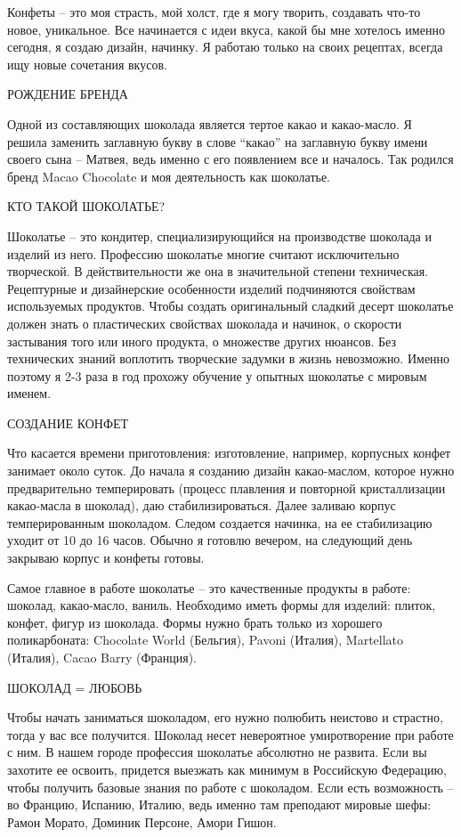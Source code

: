 
Конфеты – это моя страсть, мой холст, где я могу творить, создавать что-то
новое, уникальное. Все начинается с идеи вкуса, какой бы мне хотелось именно
сегодня, я создаю дизайн, начинку. Я работаю только на своих рецептах, всегда
ищу новые сочетания вкусов.


РОЖДЕНИЕ БРЕНДА

Одной из составляющих шоколада является тертое какао и какао-масло. Я решила
заменить заглавную букву в слове \enquote{какао} на заглавную букву имени своего сына –
Матвея, ведь именно с его появлением все и началось. Так родился бренд Macao
Chocolate и моя деятельность как шоколатье.


КТО ТАКОЙ ШОКОЛАТЬЕ?

Шоколатье – это кондитер, специализирующийся на производстве шоколада и изделий
из него. Профессию шоколатье многие считают исключительно творческой. В
действительности же она в значительной степени техническая. Рецептурные и
дизайнерские особенности изделий подчиняются свойствам используемых продуктов.
Чтобы создать оригинальный сладкий десерт шоколатье должен знать о пластических
свойствах шоколада и начинок, о скорости застывания того или иного продукта, о
множестве других нюансов. Без технических знаний воплотить творческие задумки в
жизнь невозможно. Именно поэтому я 2-3 раза в год прохожу обучение у опытных
шоколатье с мировым именем.

СОЗДАНИЕ КОНФЕТ

Что касается времени приготовления: изготовление, например, корпусных конфет
занимает около суток. До начала я созданию дизайн какао-маслом, которое нужно
предварительно темперировать (процесс плавления и повторной кристаллизации
какао-масла в шоколад), даю стабилизироваться. Далее заливаю корпус
темперированным шоколадом. Следом создается начинка, на ее стабилизацию уходит
от 10 до 16 часов. Обычно я готовлю вечером, на следующий день закрываю корпус
и конфеты готовы.

Самое главное в работе шоколатье – это качественные продукты в работе: шоколад,
какао-масло, ваниль. Необходимо иметь формы для изделий: плиток, конфет, фигур
из шоколада. Формы нужно брать только из хорошего поликарбоната: Chocolate
World (Бельгия), Pavoni (Италия), Martellato (Италия), Cacao Barry (Франция).

ШОКОЛАД = ЛЮБОВЬ

Чтобы начать заниматься шоколадом, его нужно полюбить неистово и страстно,
тогда у вас все получится. Шоколад несет невероятное умиротворение при работе с
ним. В нашем городе профессия шоколатье абсолютно не развита. Если вы захотите
ее освоить, придется выезжать как минимум в Российскую Федерацию, чтобы
получить базовые знания по работе с шоколадом. Если есть возможность – во
Францию, Испанию, Италию, ведь именно там преподают мировые шефы: Рамон Морато,
Доминик Персоне, Амори Гишон.

